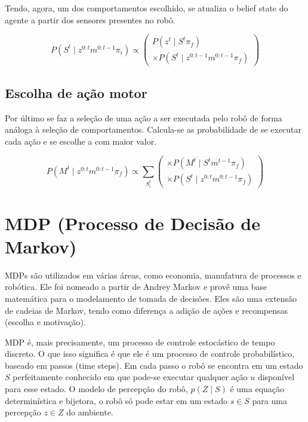 Tendo, agora, um dos comportamentos escolhido, se atualiza o belief state do agente a partir dos sensores presentes no robô.

\begin{equation}
    P \left( S^t \mid z^{0: t} m^{0: t-1} \pi_i \right) \propto 
        \left(
            \begin{array}{l}
                P \left( z^t \mid S^t \pi_f \right) \\
                \times P \left( S^t \mid z^{0: t-1} m^{0: t-1} \pi_f \right)
            \end{array}
        \right)
\end{equation}


\subsection{Escolha de ação motor}

Por último se faz a seleção de uma ação a ser executada pelo robô de forma análoga à seleção de comportamentos. Calcula-se as probabilidade de se executar cada ação  e se escolhe a com maior valor.

\begin{equation}
    P \left( M^t \mid z^{0: t} m^{0: t-1} \pi_f \right) \propto \sum\limits_{S_i^t}
        \left(
            \begin{array}{l}
                \times P \left( M^t \mid S^t m^{t-1} \pi_f \right)\\
                \times P \left( S^t \mid z^{0: t} m^{0: t-1} \pi_f \right)
            \end{array}
        \right)
\end{equation}


\section{MDP (Processo de Decisão de Markov)} \label{section:MDP}

MDPs são utilizados em várias áreas, como economia, manufatura de processos e robótica. Ele foi nomeado a partir de Andrey Markov e provê uma base matemática para o modelamento de tomada de decisões. Eles são uma extensão de cadeias de Markov, tendo como diferença a adição de ações e recompensas (escolha e motivação).

MDP é, mais precisamente, um processo de controle estocástico de tempo discreto. O que isso significa é que ele é um processo de controle probabilístico, baseado em passos (time steps). Em cada passo o robô se encontra em um estado $ S $ perfeitamente conhecido em que pode-se executar qualquer ação $ u $ disponível para esse estado. O modelo de percepção do robô, $ p \left( Z \mid S \right) $ é uma equação determinística e bijetora, o robô só pode estar em um estado $ s \in S $ para uma percepção $ z \in Z $ do ambiente.

